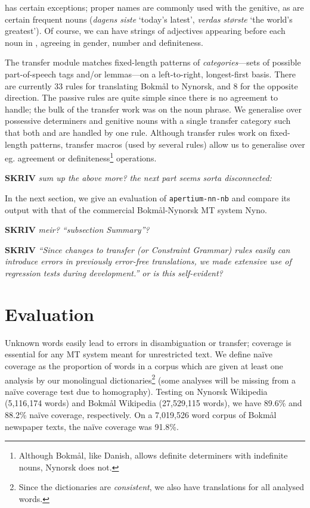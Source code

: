\documentclass[11pt]{article}
\newcommand{\comment}[1]{\textbf{SKRIV} {\it #1}}
\begin{document}
\Last has certain exceptions; proper names are commonly used with the
genitive, as are certain frequent nouns (\emph{dagens siste} `today's
latest', \emph{verdas største} `the world's greatest'). Of course, we
can have strings of adjectives appearing before each noun in
\Last[a-d], agreeing in gender, number and definiteness. 

The transfer module matches fixed-length patterns of
\emph{categories}—sets of possible part-of-speech tags and/or
lemmas—on a left-to-right, longest-first basis. There are currently 33
rules for translating Bokmål to Nynorsk, and 8 for the opposite
direction. The passive rules are quite simple since there is no
agreement to handle; the bulk of the transfer work was on the noun
phrase. We generalise over possessive determiners and genitive nouns
with a single transfer category such that both \Last[a-b] and
\Last[c-d] are handled by one rule. Although transfer rules work on
fixed-length patterns, transfer macros (used by several rules) allow
us to generalise over eg. agreement or definiteness\footnote{Although
  Bokmål, like Danish, allows definite determiners with indefinite
  nouns, Nynorsk does not.} operations.

\comment{sum up the above more? the next part seems sorta disconnected:}

In the next section, we give an evaluation of {\tt apertium-nn-nb} and
compare its output with that of the commercial Bokmål-Nynorsk MT
system Nyno.

\comment{ meir? ``subsection Summary''? }

\comment{ ``Since changes to transfer (or Constraint
  Grammar) rules easily can introduce errors in previously error-free
  translations, we made extensive use of regression tests during
  development.'' or is this self-evident?}




\section{Evaluation}
\label{sec:eval}

Unknown words easily lead to errors in disambiguation or transfer;
coverage is essential for any MT system meant for unrestricted text.
 We define naïve coverage as the proportion of words in a corpus which
are given at least one analysis by our monolingual
dictionaries\footnote{Since the dictionaries are \emph{consistent}, we
  also have translations for all analysed words.} (some analyses will
be missing from a naïve coverage test due to homography). Testing on
Nynorsk Wikipedia (5,116,174 words) and Bokmål Wikipedia (27,529,115
words), we have 89.6\% and 88.2\% naïve coverage, respectively. On a
7,019,526 word corpus of Bokmål newspaper texts, the naïve coverage
was 91.8\%. 
\end{document}
